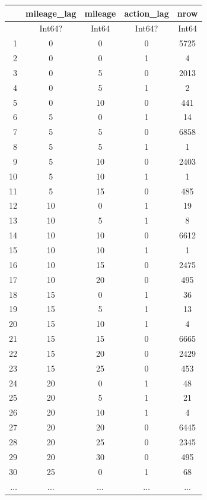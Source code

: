 \documentclass[
  letterpaper,
  DIV=11,
  numbers=noendperiod]{scrreprt}
\begin{document}
\begin{tabular}{r|cccc}
    & mileage\_lag & mileage & action\_lag & nrow\\
    \hline
    & Int64? & Int64 & Int64? & Int64\\
    \hline
    1 & 0 & 0 & 0 & 5725 \\
    2 & 0 & 0 & 1 & 4 \\
    3 & 0 & 5 & 0 & 2013 \\
    4 & 0 & 5 & 1 & 2 \\
    5 & 0 & 10 & 0 & 441 \\
    6 & 5 & 0 & 1 & 14 \\
    7 & 5 & 5 & 0 & 6858 \\
    8 & 5 & 5 & 1 & 1 \\
    9 & 5 & 10 & 0 & 2403 \\
    10 & 5 & 10 & 1 & 1 \\
    11 & 5 & 15 & 0 & 485 \\
    12 & 10 & 0 & 1 & 19 \\
    13 & 10 & 5 & 1 & 8 \\
    14 & 10 & 10 & 0 & 6612 \\
    15 & 10 & 10 & 1 & 1 \\
    16 & 10 & 15 & 0 & 2475 \\
    17 & 10 & 20 & 0 & 495 \\
    18 & 15 & 0 & 1 & 36 \\
    19 & 15 & 5 & 1 & 13 \\
    20 & 15 & 10 & 1 & 4 \\
    21 & 15 & 15 & 0 & 6665 \\
    22 & 15 & 20 & 0 & 2429 \\
    23 & 15 & 25 & 0 & 453 \\
    24 & 20 & 0 & 1 & 48 \\
    25 & 20 & 5 & 1 & 21 \\
    26 & 20 & 10 & 1 & 4 \\
    27 & 20 & 20 & 0 & 6445 \\
    28 & 20 & 25 & 0 & 2345 \\
    29 & 20 & 30 & 0 & 495 \\
    30 & 25 & 0 & 1 & 68 \\
    $\dots$ & $\dots$ & $\dots$ & $\dots$ & $\dots$ \\
\end{tabular}
\end{document}
